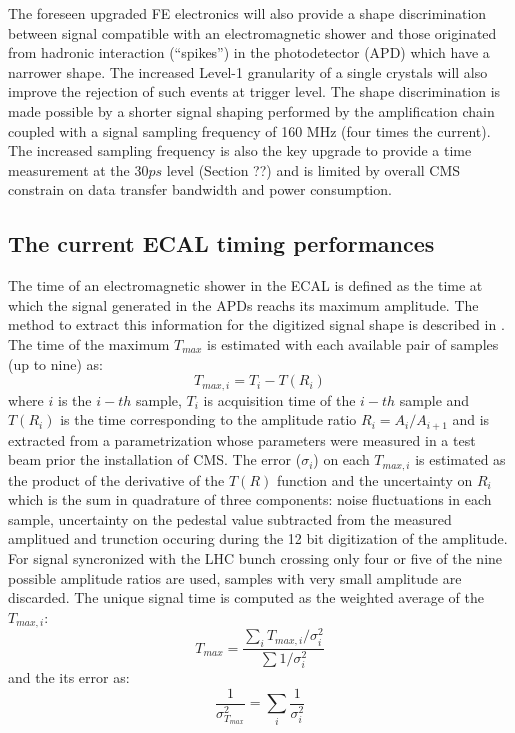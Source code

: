 The foreseen upgraded FE electronics will also provide a shape discrimination between
signal compatible with an electromagnetic shower and those originated from hadronic interaction (``spikes'') in
the photodetector (APD) which have a narrower shape. The increased Level-1 granularity of a single crystals
will also improve the rejection of such events at trigger level.
The shape discrimination is made possible by a shorter signal shaping performed by the amplification chain
coupled with a signal sampling frequency of 160 MHz (four times the current). The increased sampling
frequency is also the key upgrade to provide a time measurement at the $30 ps$ level (Section ??) and
is limited by overall CMS constrain on data transfer bandwidth and power consumption.


\subsection{The current ECAL timing performances}
The time of an electromagnetic shower in the ECAL is defined as the time at which the signal generated
in the APDs reachs its maximum amplitude. The method to extract this information for the digitized signal
shape is described in \cite{ecal_time_reco}. The time of the maximum $T_{max}$ is estimated with each
available pair of samples (up to nine) as:
\[
T_{max, i} = T_i - T(R_i)
\]
where $i$ is the $i-th$ sample, $T_i$ is acquisition time of the $i-th$ sample and $T(R_i)$ is the time
corresponding to the amplitude ratio $R_i = A_i/A_{i+1}$ and is extracted from a parametrization whose parameters
were measured in a test beam prior the installation of CMS. The error ($\sigma_i$) on each $T_{max, i}$ is estimated as
the product of the derivative of the $T(R)$ function and the uncertainty on $R_i$ which is the sum in quadrature
of three components: noise fluctuations in each sample, uncertainty on the pedestal value subtracted from the measured amplitued
and trunction occuring during the 12 bit digitization of the amplitude.
For signal syncronized with the LHC bunch crossing only four or five of the nine possible amplitude
ratios are used, samples with very small amplitude are discarded. The unique signal time is computed
as the weighted average of the  $T_{max, i}$:
\[
  T_{max} = \frac{\sum_i T_{max, i}/\sigma_i^2}{\sum 1/\sigma_i^2}
\]
and the its error as:
\[
  \frac{1}{\sigma_{T_{max}}^2} = \sum_i\frac{1}{\sigma_i^2}
\]

